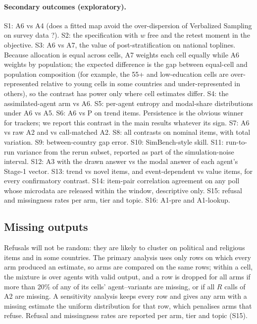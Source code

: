 \documentclass[11pt]{article}
\begin{document}
\paragraph{Secondary outcomes (exploratory).}
S1: A6 vs A4 (does a fitted map avoid the over-dispersion of Verbalized Sampling on survey data \citep{ozkan2026distribution}?).
S2: the specification with $w$ free and the retest moment in the objective.
S3: A6 vs A7, the value of post-stratification on national toplines. Because allocation is equal across cells, A7 weights each cell equally while A6 weights by population; the expected difference is the gap between equal-cell and population composition (for example, the 55+ and low-education cells are over-represented relative to young cells in some countries and under-represented in others), so the contrast has power only where cell estimates differ.
S4: the assimilated-agent arm vs A6.
S5: per-agent entropy and modal-share distributions under A6 vs A5.
S6: A6 vs P on trend items. Persistence is the obvious winner for trackers; we report this contrast in the main results whatever its sign.
S7: A6 vs raw A2 and vs call-matched A2.
S8: all contrasts on nominal items, with total variation.
S9: between-country gap error.
S10: SimBench-style skill.
S11: run-to-run variance from the rerun subset, reported as part of the simulation-noise interval.
S12: A3 with the drawn answer vs the modal answer of each agent's Stage-1 vector.
S13: trend vs novel items, and event-dependent vs value items, for every confirmatory contrast.
S14: item-pair correlation agreement on any poll whose microdata are released within the window, descriptive only.
S15: refusal and missingness rates per arm, tier and topic.
S16: A1-pre and A1-lookup.

\subsection{Missing outputs}
\label{sec:missing}
Refusals will not be random: they are likely to cluster on political and religious items and in some countries. The primary analysis uses only rows on which every arm produced an estimate, so arms are compared on the same rows; within a cell, the mixture is over agents with valid output, and a row is dropped for all arms if more than 20\% of any of its cells' agent--variants are missing, or if all $R$ calls of A2 are missing. A sensitivity analysis keeps every row and gives any arm with a missing estimate the uniform distribution for that row, which penalises arms that refuse. Refusal and missingness rates are reported per arm, tier and topic (S15).
\end{document}
